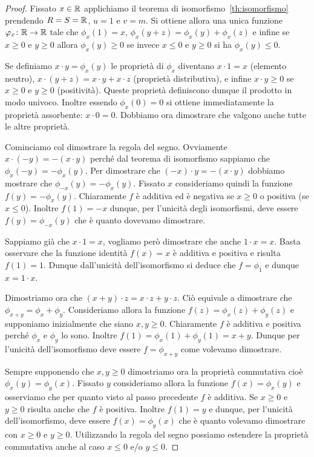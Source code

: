 %
\begin{proof}
Fissato $x\in {\mathbb R}$
applichiamo il teorema di isomorfismo~\ref{th:isomorfismo}
prendendo $R=S={\mathbb R}$, $u=1$ e $v=m$.
Si ottiene allora una unica funzione $\varphi_x\colon {\mathbb R}\to {\mathbb R}$ 
tale che $\phi_x(1)=x$, $\phi_x(y+z)=\phi_x(y)+\phi_x(z)$ 
e infine se $x\ge 0$ e $y\ge 0$ 
allora $\phi_x(y)\ge 0$ se 
invece $x\le 0$ e $y\ge 0$ si ha $\phi_x(y)\le 0$.

Se definiamo $x\cdot y = \phi_x(y)$ 
le proprietà di $\phi_x$ diventano 
$x\cdot 1 = x$ (elemento neutro), 
$x\cdot (y+z) = x\cdot y + x\cdot z$ (proprietà distributiva),
e infine $x\cdot y\ge 0$ se $x\ge 0$ e $y\ge 0$ (positività).
Queste proprietà definiscono dunque il prodotto 
in modo univoco. 
Inoltre essendo $\phi_x(0)=0$ si ottiene immediatamente 
la proprietà assorbente: $x\cdot 0 = 0$.
Dobbiamo ora dimostrare che valgono anche tutte le 
altre proprietà. 

Cominciamo col dimostrare la regola del segno.
Ovviamente $x\cdot(-y) = -(x\cdot y)$ perché dal teorema 
di isomorfismo sappiamo che $\phi_x(-y) = -\phi_x(y)$.
Per dimostrare che $(-x)\cdot y=-(x\cdot y)$ dobbiamo 
mostrare che $\phi_{-x}(y)=-\phi_x(y)$. 
Fissato $x$ consideriamo quindi la funzione 
$f(y) = -\phi_x(y)$. 
Chiaramente $f$ è additiva ed è negativa se $x\ge 0$
o positiva (se $x\le 0$). 
Inoltre $f(1) = -x$ dunque, per l'unicità degli isomorfismi,
deve essere $f(y) = \phi_{-x}(y)$ che è quanto dovevamo dimostrare.

Sappiamo già che $x\cdot 1=x$, vogliamo però dimostrare 
che anche $1\cdot x=x$. 
Basta osservare che la funzione identità $f(x)=x$ 
è additiva e positiva e risulta $f(1)=1$.
Dunque dall'unicità dell'isomorfismo si deduce che $f = \phi_1$
e dunque $x=1\cdot x$.

Dimostriamo ora che $(x+y)\cdot z = x\cdot z + y\cdot z$.
Ciò equivale a dimostrare che $\phi_{x+y} = \phi_x + \phi_y$.
Consideriamo allora la funzione $f(z)=\phi_x(z) + \phi_y(z)$
e supponiamo inizialmente che siano $x,y\ge 0$.
Chiaramente $f$ è additiva e positiva
perché $\phi_x$ e $\phi_y$ lo sono.
Inoltre $f(1)=\phi_x(1) + \phi_y(1) = x+y$. 
Dunque per l'unicità dell'isomorfismo 
deve essere $f = \phi_{x+y}$ come volevamo dimostrare.

Sempre supponendo che $x,y\ge 0$ 
dimostriamo ora la proprietà commutativa cioè
$\phi_x(y) = \phi_y(x)$. 
Fissato $y$ consideriamo allora la funzione $f(x) = \phi_x(y)$
e osserviamo che per quanto visto al passo precedente 
$f$ è additiva. 
Se $x\ge 0$ e $y\ge 0$ risulta anche che $f$ è positiva.
Inoltre $f(1) = y$ e dunque, per l'unicità dell'isomorfismo,
deve essere $f(x) = \phi_y(x)$ che è quanto volevamo dimostrare
con $x\ge 0$ e $y\ge 0$.
Utilizzando la regola del segno possiamo estendere 
la proprietà commutativa anche al caso $x\le 0$ e/o $y\le 0$.


\end{proof}
